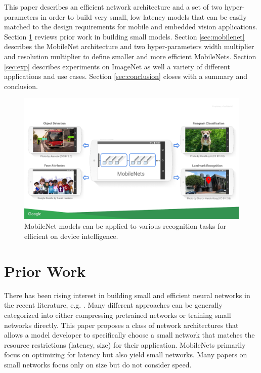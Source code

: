 \documentclass[10pt,twocolumn,letterpaper]{article}
\begin{document}
This paper describes an efficient network architecture and a set of two hyper-parameters in order to build very small, low latency models that can be easily matched to the design requirements for mobile and embedded vision applications. Section \ref{sec:prior} reviews prior work in building small models. Section \ref{sec:mobilenet} describes the MobileNet architecture and two hyper-parameters width multiplier and resolution multiplier to define smaller and more efficient MobileNets. Section \ref{sec:exp} describes experiments on ImageNet as well a variety of different applications and use cases. Section \ref{sec:conclusion} closes with a summary and conclusion.

\begin{figure}
\centering
  \includegraphics[width=2\columnwidth]{mobilenet_pic.pdf}
  \caption{MobileNet models can be applied to various recognition tasks for efficient on device intelligence.}
  \label{fig:conv_layers}
\end{figure}

\section{Prior Work} \label{sec:prior}
There has been rising interest in building small and efficient neural networks in the recent literature, e.g. \cite{jin2014flattened,wang2016factorized,iandola2016squeezenet,wu2015quantized,rastegari2016xnor}. Many different approaches can be generally categorized into either compressing pretrained networks or training small networks directly. This paper proposes a class of network architectures that allows a model developer to specifically choose a small network that matches the resource restrictions (latency, size) for their application. MobileNets primarily focus on optimizing for latency but also yield small networks. Many papers on small networks focus only on size but do not consider speed.
\end{document}
